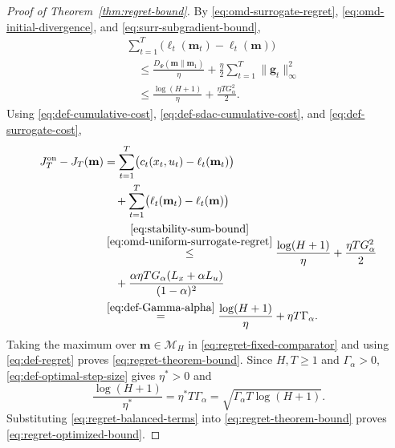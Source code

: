 \documentclass[journal]{IEEEtran}
\theoremstyle{remark}
\begin{document}
\begin{proof}[Proof of Theorem~\ref{thm:regret-bound}]
By \eqref{eq:omd-surrogate-regret}, \eqref{eq:omd-initial-divergence}, and
\eqref{eq:surr-subgradient-bound},
\begin{equation}
\label{eq:omd-uniform-surrogate-regret}
\begin{aligned}
&\sum_{t=1}^T\bigl(\ell_t(\mathbf{m}_t)-\ell_t(\mathbf{m})\bigr)\\
&\quad\le\frac{D_\Psi(\mathbf{m}\|\mathbf{m}_1)}{\eta}
+\frac{\eta}{2}\sum_{t=1}^T\|\mathbf{g}_t\|_\infty^2\\
&\quad\le\frac{\log(H+1)}{\eta}+\frac{\eta T G_\alpha^2}{2}.
\end{aligned}
\end{equation}
Using \eqref{eq:def-cumulative-cost}, \eqref{eq:def-sdac-cumulative-cost},
and \eqref{eq:def-surrogate-cost},
\begin{equation}
\label{eq:regret-fixed-comparator}
\begin{aligned}
J_T^{\mathrm{on}}-J_T(\mathbf{m})
&=\sum_{t=1}^T\bigl(c_t(x_t,u_t)-\ell_t(\mathbf{m}_t)\bigr) \\
&\quad+\sum_{t=1}^T
\bigl(\ell_t(\mathbf{m}_t)-\ell_t(\mathbf{m})\bigr) \\
&\overset{\substack{\eqref{eq:stability-sum-bound}\\
\eqref{eq:omd-uniform-surrogate-regret}}}{\le}
\frac{\log(H+1)}{\eta}
+\frac{\eta T G_\alpha^2}{2} \\
&\quad+\frac{\alpha\eta T G_\alpha(L_x+\alpha L_u)}
{(1-\alpha)^2} \\
&\overset{\eqref{eq:def-Gamma-alpha}}{=}
\frac{\log(H+1)}{\eta}+\eta T\Gamma_\alpha.
\end{aligned}
\end{equation}
Taking the maximum over $\mathbf{m}\in\mathcal{M}_H$ in
\eqref{eq:regret-fixed-comparator} and using \eqref{eq:def-regret} proves
\eqref{eq:regret-theorem-bound}.
Since $H,T\ge1$ and $\Gamma_\alpha>0$, \eqref{eq:def-optimal-step-size} gives
$\eta^*>0$ and
\begin{equation}
\label{eq:regret-balanced-terms}
\frac{\log(H+1)}{\eta^*}
=\eta^*T\Gamma_\alpha
=\sqrt{\Gamma_\alpha T\log(H+1)}.
\end{equation}
Substituting \eqref{eq:regret-balanced-terms} into
\eqref{eq:regret-theorem-bound} proves \eqref{eq:regret-optimized-bound}.
\end{proof}
\end{document}
